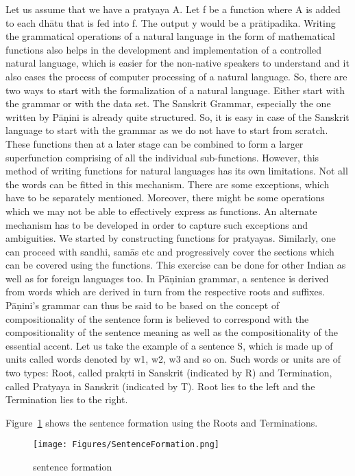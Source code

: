 Let us assume that we have a pratyaya A. Let f be a function where A is added to each dhātu that is fed into f. The output y would be a prātipadika. Writing the grammatical operations of a natural language in the form of mathematical functions also helps in the development and implementation of a controlled natural language, which is easier for the non-native speakers to understand and it also eases the process of computer processing of a natural language.
So, there are two ways to start with the formalization of a natural language. Either start with the grammar or with the data set. The Sanskrit Grammar, especially the one written by Pāṇini is already quite structured. So, it is easy in case of the Sanskrit language to start with the grammar as we do not have to start from scratch. These functions then at a later stage can be combined to form a larger superfunction comprising of all the individual sub-functions. 
However, this method of writing functions for natural languages has its own limitations. Not all the words can be fitted in this mechanism. There are some exceptions, which have to be separately mentioned. Moreover, there might be some operations which we may not be able to effectively express as functions. An alternate mechanism has to be developed in order to capture such exceptions and ambiguities. 
We started by constructing functions for pratyayas. Similarly, one can proceed with sandhi, samās etc and progressively cover the sections which can be covered using the functions. This exercise can be done for other Indian as well as for foreign languages too.  
In Pāṇinian grammar, a sentence is derived from words which are derived in turn from the respective roots and suffixes. Pāṇini's grammar can thus be said to be based on the concept of compositionality of the sentence form is believed to correspond with the compositionality of the sentence meaning as well as the compositionality of the essential accent.
Let us take the example of a sentence S, which is made up of units called words denoted by w1, w2, w3 and so on. Such words or units are of two types:
Root, called prakṛti in Sanskrit (indicated by R) and Termination, called Pratyaya in Sanskrit (indicated by T). Root lies to the left and the Termination lies to the right.

Figure~\ref{fig:s} shows the sentence formation using the Roots and Terminations.
\begin{figure}[!h]
	\centering
	\texttt{[image: Figures/SentenceFormation.png]}
	\hspace{1mm}
	\caption{sentence formation} 
	\label{fig:s}
\end{figure}

